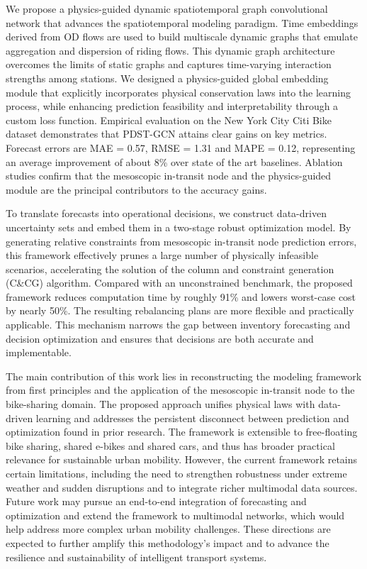 \documentclass[preprint,12pt,authoryear]{elsarticle}
\begin{document}
We propose a physics-guided dynamic spatiotemporal graph convolutional network that advances the spatiotemporal modeling paradigm. Time embeddings derived from OD flows are used to build multiscale dynamic graphs that emulate aggregation and dispersion of riding flows. This dynamic graph architecture overcomes the limits of static graphs and captures time-varying interaction strengths among stations. We designed a physics-guided global embedding module that explicitly incorporates physical conservation laws into the learning process, while enhancing prediction feasibility and interpretability through a custom loss function. Empirical evaluation on the New York City Citi Bike dataset demonstrates that PDST-GCN attains clear gains on key metrics. Forecast errors are MAE = 0.57, RMSE = 1.31 and MAPE = 0.12, representing an average improvement of about 8\% over state of the art baselines. Ablation studies confirm that the mesoscopic in-transit node and the physics-guided module are the principal contributors to the accuracy gains.

To translate forecasts into operational decisions, we construct data-driven uncertainty sets and embed them in a two-stage robust optimization model. By generating relative constraints from mesoscopic in-transit node prediction errors, this framework effectively prunes a large number of physically infeasible scenarios, accelerating the solution of the column and constraint generation (C\&CG) algorithm. Compared with an unconstrained benchmark, the proposed framework reduces computation time by roughly 91\% and lowers worst-case cost by nearly 50\%. The resulting rebalancing plans are more flexible and practically applicable. This mechanism narrows the gap between inventory forecasting and decision optimization and ensures that decisions are both accurate and implementable.

The main contribution of this work lies in reconstructing the modeling framework from first principles and the application of the mesoscopic in-transit node to the bike-sharing domain. The proposed approach unifies physical laws with data-driven learning and addresses the persistent disconnect between prediction and optimization found in prior research. The framework is extensible to free-floating bike sharing, shared e-bikes and shared cars, and thus has broader practical relevance for sustainable urban mobility. However, the current framework retains certain limitations, including the need to strengthen robustness under extreme weather and sudden disruptions and to integrate richer multimodal data sources. Future work may pursue an end-to-end integration of forecasting and optimization and extend the framework to multimodal networks, which would help address more complex urban mobility challenges. These directions are expected to further amplify this methodology's impact and to advance the resilience and sustainability of intelligent transport systems.
\end{document}
